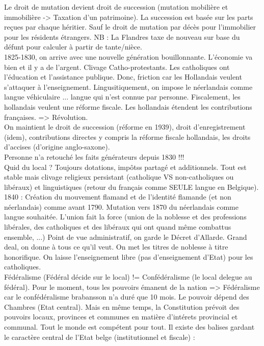\documentclass{book}
\begin{document}
Le droit de mutation devient droit de succession (mutation mobilière et immobilière -> Taxation d'un patrimoine). La succession est basée sur les parts reçues par chaque héritier. Sauf le droit de mutation par décès pour l'immobilier pour les résidents étrangers. NB : La Flandres taxe de nouveau sur base du défunt pour calculer à partir de tante/nièce.\\

1825-1830, on arrive avec une nouvelle génération bouillonnante. L'économie va bien et il y a de l'argent. Clivage Catho-protestants. Les catholiques ont l'éducation et l'assistance publique. Donc, friction car les Hollandais veulent s'attaquer à l'enseignement. Lingusitiquement, on impose le néerlandais comme langue véhiculaire ... langue qui n'est connue par personne. Fiscalement, les hollandais veulent une réforme fiscale. Les hollandais étendent les contributions françaises. => Révolution.\\

On maintient le droit de succession (réforme en 1939), droit d'enregistrement (idem), contributions directes y compris la réforme fiscale hollandais, les droits d'accises (d'origine anglo-saxone).\\

Personne n'a retouché les faits générateurs depuis 1830 !!!\\

Quid du local ? Toujours dotations, impôtss partagé et additionnels. Tout est stable mais clivage religieux persistant (catholique VS non-catholiques ou libéraux) et linguistiques (retour du français comme SEULE langue en Belgique). 1840 : Création du mouvement flamand et de l'identité flamande (et non néerlandais) comme avant 1790. Mutation vers 1870 du néerlandais comme langue souhaitée. L'union fait la force (union de la noblesse et des professions libérales, des catholiques et des libéraux qui ont quand même combattus ensemble, ...) Point de vue administratif, on garde le Décret d'Allarde. Grand deal, on donne à tous ce qu'il veut. On met les titres de noblesse à titre honorifique. On laisse l'enseignement libre (pas d'enseignement d'Etat) pour les catholiques.\\

Fédéralisme (Fédéral décide sur le local) != Confédéralisme (le local delegue au fédéral). Pour le moment, tous les pouvoirs émanent de la nation => Fédéralisme car le confédéralisme brabansson n'a duré que 10 mois. Le pouvoir dépend des Chambres (Etat central). Mais en même temps, la Constitution prévoit des pouvoirs locaux, provinces et communes en matière d'intérets provincial et communal. Tout le monde est compétent pour tout. Il existe des balises gardant le caractère central de l'Etat belge (institutionnel et fiscale) :\\
\end{document}
